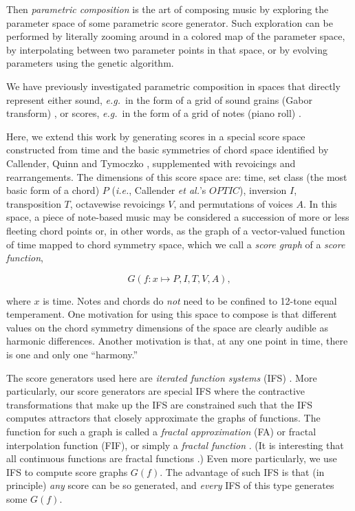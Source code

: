 \documentclass[english,11pt,letterpaper,onecolumn]{scrartcl}
\numberwithin{equation}{section}
\newcommand{\be}{\begin{equation}}
\newcommand{\ee}{\end{equation}}
\begin{document}
Then \textit{parametric composition} is the art of composing music by exploring
the parameter space of some parametric score generator. Such exploration can be
performed by literally zooming around in a colored map of the parameter space,
by interpolating between two parameter points in that space, or by evolving
parameters using the genetic algorithm.

We have previously investigated parametric composition in spaces that directly
represent either sound, \textit{e.g.}\ in the form of a grid of sound grains
(Gabor transform) \cite{obsessed}, or scores, \textit{e.g.}\ in the form of a
grid of notes (piano roll) \cite{ifsmusic}.

Here, we extend this work by generating scores in a special score space
constructed from time and the basic symmetries of chord space identified by
Callender, Quinn and Tymoczko \cite{callender:346}, supplemented with revoicings
and rearrangements. The dimensions of this score space are: time, set class (the
most basic form of a chord) $P$ (\textit{i.e.}, Callender \textit{et al.}'s
$OPTIC$), inversion $I$, transposition $T$, octavewise revoicings $V$, and
permutations of voices $A$. In this space, a piece of note-based music may be
considered a succession of more or less fleeting chord points or, in other
words, as the graph of a vector-valued function of time mapped to chord symmetry
space, which we call a \textit{score graph} of a \textit{score function},

\be \label{score_graph}
G(f: x \mapsto P, I, T, V, A),
\ee

\noindent where $x$ is time. Notes and chords do \textit{not} need to be
confined to 12-tone equal temperament. One motivation for using this space to
compose is that different values on the chord symmetry dimensions of the space
are clearly audible as harmonic differences. Another motivation is that, at any
one point in time, there is one and only one ``harmony.''

The score generators used here are \textit{iterated function systems} (IFS)
\cite{barnsley1985iterated, 10.2307/24893080, fractalseverywhere}. More
particularly, our score generators are special IFS where the contractive
transformations that make up the IFS are constrained such that the IFS computes
attractors that closely approximate the graphs of functions. The function for
such a graph is called a \textit{fractal approximation} (FA) or fractal
interpolation function (FIF), or simply a \textit{fractal function}
\cite{Barnsley1986, fractalseverywhere, navascues2014fractal}. (It is
interesting that all continuous functions are fractal functions
\cite{2016arXiv161001369B}.) Even more particularly, we use IFS to compute
score graphs $G(f)$. The advantage of such IFS is that (in principle)
\textit{any} score can be so generated, and \textit{every} IFS of this type
generates some $G(f)$.
\end{document}
